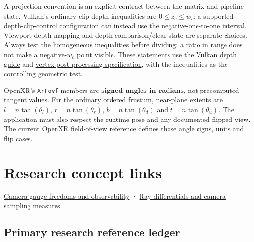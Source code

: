 A projection convention is an explicit contract between the matrix and pipeline state. Vulkan's ordinary clip-depth inequalities are \(0\le z_c\le w_c\); a supported depth-clip-control configuration can instead use the negative-one-to-one interval. Viewport depth mapping and depth comparison/clear state are separate choices. Always test the homogeneous inequalities before dividing: a ratio in range does not make a negative-\(w_c\) point visible. These statements use the \href{https://docs.vulkan.org/guide/latest/depth.html}{Vulkan depth guide} and \href{https://docs.vulkan.org/spec/latest/chapters/vertexpostproc.html}{vertex post-processing specification}, with the inequalities as the controlling geometric test.

OpenXR's \texttt{XrFovf} members are \textbf{signed angles in radians}, not precomputed tangent values. For the ordinary ordered frustum, near-plane extents are \(l=n\tan(\theta_l)\), \(r=n\tan(\theta_r)\), \(b=n\tan(\theta_d)\) and \(t=n\tan(\theta_u)\). The application must also respect the runtime pose and any documented flipped view. The \href{https://registry.khronos.org/OpenXR/specs/1.1/man/html/XrFovf.html}{current OpenXR field-of-view reference} defines those angle signs, units and flip cases.

\section{Research concept links}\label{02-foundations-ii-ch039-research-concept-links}

\hyperref[02-foundations-ii-ch037-a-camera-model-must-close-the-loop]{Camera gauge freedoms and observability} · \hyperref[02-foundations-ii-ch037-a-camera-model-must-close-the-loop]{Ray differentials and camera sampling measures}

\subsection{Primary research reference ledger}\label{02-foundations-ii-ch039-primary-research-reference-ledger}

